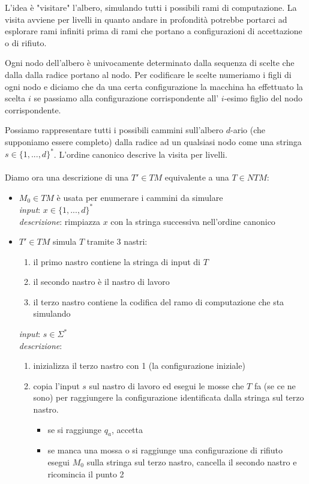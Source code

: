 L'idea è "visitare" l'albero, simulando tutti i possibili rami di computazione. La visita avviene per livelli in quanto andare in profondità potrebbe portarci ad esplorare rami infiniti prima di rami che portano a configurazioni di accettazione o di rifiuto.

Ogni nodo dell'albero è univocamente determinato dalla sequenza di scelte che dalla dalla radice portano al nodo. Per codificare le scelte numeriamo i figli di ogni nodo e diciamo che da una certa configurazione la macchina ha effettuato la scelta $i$ se passiamo alla configurazione corrispondente all' $i$-esimo figlio del nodo corrispondente.

Possiamo rappresentare tutti i possibili cammini sull'albero $d$-ario (che supponiamo essere completo) dalla radice ad un qualsiasi nodo come una stringa $s \in \{1, ..., d\}^*$. L'ordine canonico descrive la visita per livelli.
\\
\\

Diamo ora una descrizione di una $T' \in TM$ equivalente a una $T \in NTM$:
\begin{itemize}
	 \item $M_0 \in TM$ è usata per enumerare i cammini da simulare\\
	 \textit{input}: $x \in \{1, ..., d\}^*$ \\
	 \textit{descrizione}: rimpiazza $x$ con la stringa successiva nell'ordine canonico
	 
	 \item $T' \in TM$ simula $T$ tramite 3 nastri:
	 \begin{enumerate}
	 \item il primo nastro contiene la stringa di input di $T$
	 \item il secondo nastro è il nastro di lavoro
	 \item il terzo nastro contiene la codifica del ramo di computazione che sta simulando
	 \end{enumerate}
	 \textit{input}: $s \in \Sigma^*$\\
	 \textit{descrizione}:
	 \begin{enumerate}
	 \item inizializza il terzo nastro con 1 (la configurazione iniziale)
	 
	 \item copia l'input $s$ sul nastro di lavoro ed esegui le mosse che $T$ fa (se ce ne sono) per raggiungere la configurazione identificata dalla stringa sul terzo nastro.
	 \begin{itemize}
	 \item se si raggiunge $q_a$, accetta
	 
	 \item se manca una mossa o si raggiunge una configurazione di rifiuto esegui $M_0$ sulla stringa sul terzo nastro, cancella il secondo nastro e ricomincia il punto 2
	 \end{itemize}
	 \end{enumerate}
 \end{itemize} 
